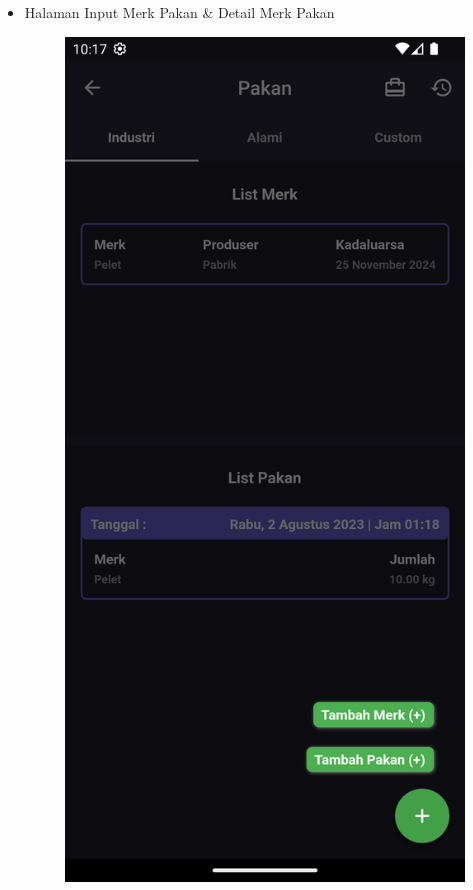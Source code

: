 \begin{spacing}{1.5}
\begin{enumerate}
		\begin{itemize}
			\item Halaman Input Merk Pakan \& Detail Merk Pakan
				
			\begin{figure}[H]
					\includegraphics[width=\linewidth]{gambar/sprint4/pakan_choose.png}

\end{figure}
\end{itemize}
\end{enumerate}
\end{spacing}
